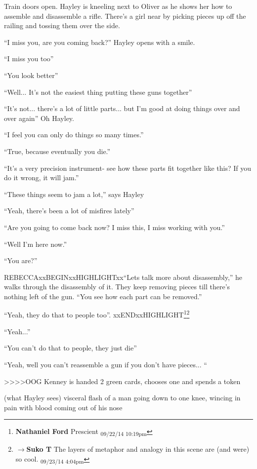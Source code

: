 Train doors open.  Hayley is kneeling next to Oliver as he shows her how to assemble and disassemble a rifle.  There's a girl near by picking pieces up off the railing and tossing them over the side. 



``I miss you, are you coming back?'' Hayley opens with a smile.

``I miss you too''

``You look better''

``Well... It's not the easiest thing putting these guns together''

``It's not...  there's a lot of little parts... but I'm good at doing things over and over again'' Oh Hayley.

``I feel you can only do things so many times.''

``True, because eventually you die.''

``It's a very precision instrument- see how these parts fit together like this?  If you do it wrong, it will jam.''

``These things seem to jam a lot,'' says Hayley

``Yeah, there's been a lot of misfires lately''

``Are you going to come back now?  I miss this, I miss working with you.''

``Well I'm here now.''

``You are?''

REBECCAxxBEGINxxHIGHLIGHTxx``Lets talk more about disassembly,'' he walks through the disassembly of it. They keep removing pieces till there's nothing left of the gun.  ``You see how each part can be removed.''

``Yeah, they do that to people too''. xxENDxxHIGHLIGHT\footnote{\textbf{Nathaniel Ford }Prescient \textsubscript{09/22/14 10:19pm}}\footnote{$\rightarrow$\textbf{Suko T }The layers of metaphor and analogy in this scene are (and were) so cool. \textsubscript{09/23/14 4:04pm}}

``Yeah...''

``You can't do that to people, they just die''

``Yeah, well you can't reassemble a gun if you don't have pieces... ``



\textgreater \textgreater \textgreater \textgreater   OOG Kenney is handed 2 green cards, chooses one and spends a token

   (what Hayley sees) visceral flash of a man going down to one knee, wincing in pain with blood coming out of his nose


